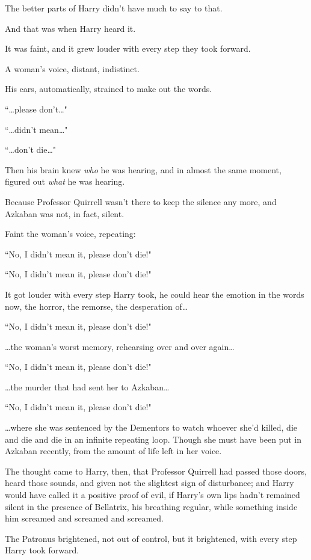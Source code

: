 The better parts of Harry didn't have much to say to that.

And that was when Harry heard it.

It was faint, and it grew louder with every step they took forward.

A woman's voice, distant, indistinct.

His ears, automatically, strained to make out the words.

``{\ldots}please don't{\ldots}"

``{\ldots}didn't mean{\ldots}"

``{\ldots}don't die{\ldots}"

Then his brain knew \emph{who} he was hearing, and in almost the same moment, figured out \emph{what} he was hearing.

Because Professor Quirrell wasn't there to keep the silence any more, and Azkaban was not, in fact, silent.

Faint the woman's voice, repeating:

``No, I didn't mean it, please don't die!"

``No, I didn't mean it, please don't die!"

It got louder with every step Harry took, he could hear the emotion in the words now, the horror, the remorse, the desperation of{\ldots}

``No, I didn't mean it, please don't die!"

{\ldots}the woman's worst memory, rehearsing over and over again{\ldots}

``No, I didn't mean it, please don't die!"

{\ldots}the murder that had sent her to Azkaban{\ldots}

``No, I didn't mean it, please don't die!"

{\ldots}where she was sentenced by the Dementors to watch whoever she'd killed, die and die and die in an infinite repeating loop. Though she must have been put in Azkaban recently, from the amount of life left in her voice.

The thought came to Harry, then, that Professor Quirrell had passed those doors, heard those sounds, and given not the slightest sign of disturbance; and Harry would have called it a positive proof of evil, if Harry's own lips hadn't remained silent in the presence of Bellatrix, his breathing regular, while something inside him screamed and screamed and screamed.

The Patronus brightened, not out of control, but it brightened, with every step Harry took forward.

